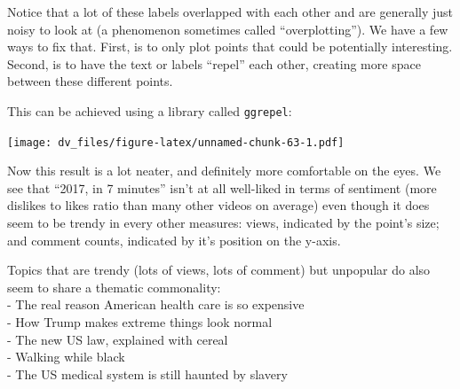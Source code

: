 \documentclass[]{article}
\newenvironment{Shaded}{\begin{snugshade}}{\end{snugshade}}
\newcommand{\DataTypeTok}[1]{\textcolor[rgb]{0.13,0.29,0.53}{#1}}
\newcommand{\DecValTok}[1]{\textcolor[rgb]{0.00,0.00,0.81}{#1}}
\newcommand{\FloatTok}[1]{\textcolor[rgb]{0.00,0.00,0.81}{#1}}
\newcommand{\KeywordTok}[1]{\textcolor[rgb]{0.13,0.29,0.53}{\textbf{#1}}}
\newcommand{\NormalTok}[1]{#1}
\newcommand{\OperatorTok}[1]{\textcolor[rgb]{0.81,0.36,0.00}{\textbf{#1}}}
\newcommand{\StringTok}[1]{\textcolor[rgb]{0.31,0.60,0.02}{#1}}
\begin{document}
Notice that a lot of these labels overlapped with each other and are
generally just noisy to look at (a phenomenon sometimes called
``overplotting''). We have a few ways to fix that. First, is to only
plot points that could be potentially interesting. Second, is to have
the text or labels ``repel'' each other, creating more space between
these different points.

This can be achieved using a library called \texttt{ggrepel}:

\begin{Shaded}
\end{Shaded}

\texttt{[image: dv\_files/figure-latex/unnamed-chunk-63-1.pdf]}

Now this result is a lot neater, and definitely more comfortable on the
eyes. We see that ``2017, in 7 minutes'' isn't at all well-liked in
terms of sentiment (more dislikes to likes ratio than many other videos
on average) even though it does seem to be trendy in every other
measures: views, indicated by the point's size; and comment counts,
indicated by it's position on the y-axis.

Topics that are trendy (lots of views, lots of comment) but unpopular do
also seem to share a thematic commonality:\\
- The real reason American health care is so expensive\\
- How Trump makes extreme things look normal\\
- The new US law, explained with cereal\\
- Walking while black\\
- The US medical system is still haunted by slavery
\end{document}
